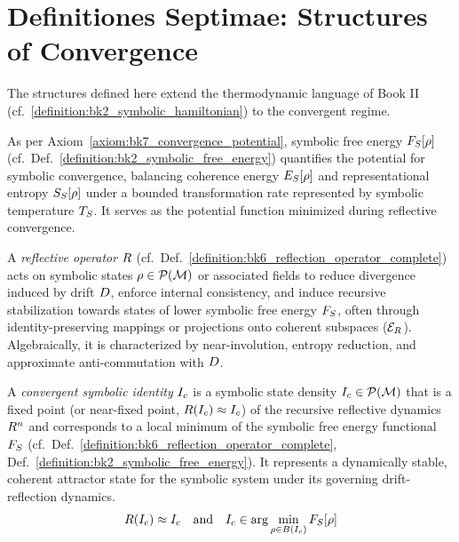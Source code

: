 \section{Definitiones Septimae: Structures of Convergence}
\label{sec:bk7_definitionnes_septimae_structures_of_convergence}
The structures defined here extend the thermodynamic language of Book II (cf.~\ref{definition:bk2_symbolic_hamiltonian}) to the convergent regime.
\begin{definition}
\label{definition:bk7_symbolic_free_energy}
As per Axiom~\ref{axiom:bk7_convergence_potential}, symbolic free energy \(F_S[\rho]\) (cf.~Def.~\ref{definition:bk2_symbolic_free_energy}) quantifies the potential for symbolic convergence, balancing coherence energy \(E_S[\rho]\) and representational entropy \(S_S[\rho]\) under a bounded transformation rate represented by symbolic temperature \(T_S\). It serves as the potential function minimized during reflective convergence.
\end{definition}
\begin{definition}
\label{definition:bk7_reflective_operator}
A \emph{reflective operator} \(R\) (cf.~Def.~\ref{definition:bk6_reflection_operator_complete}) acts on symbolic states \(\rho \in \mathcal{P}(\mathcal{M})\) or associated fields to reduce divergence induced by drift \(D\), enforce internal consistency, and induce recursive stabilization towards states of lower symbolic free energy \(F_S\), often through identity-preserving mappings or projections onto coherent subspaces (\(\mathcal{E}_R\)). Algebraically, it is characterized by near-involution, entropy reduction, and approximate anti-commutation with \(D\).
\end{definition}
\begin{definition}
\label{definition:bk7_convergent_symbolic_identity}
A \emph{convergent symbolic identity} \(I_c\) is a symbolic state density \(I_c \in \mathcal{P}(\mathcal{M})\) that is a fixed point (or near-fixed point, \(R(I_c) \approx I_c\)) of the recursive reflective dynamics \(R^n\) and corresponds to a local minimum of the symbolic free energy functional \(F_S\) (cf.~Def.~\ref{definition:bk6_reflection_operator_complete}, Def.~\ref{definition:bk2_symbolic_free_energy}). It represents a dynamically stable, coherent attractor state for the symbolic system under its governing drift-reflection dynamics.
\[
R(I_c) \approx I_c \quad \text{and} \quad I_c \in \arg\min_{\rho \in B(I_c)} F_S[\rho]
\]
\end{definition}
